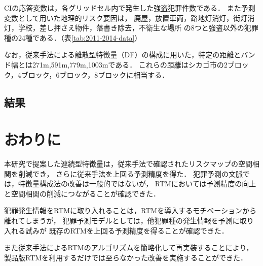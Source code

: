 CIの応答変数は，各グリッドセル内で発生した強盗犯罪件数である．
また予測変数として用いた地理的リスク要因は，
廃屋，放置車両，路地灯消灯，街灯消灯，学校，差し押さえ物件，落書き除去，不衛生な場所
の8つと強盗以外の犯罪種の24種である．（表\ref{tab:2011-2014-data}）

なお，従来手法による離散型特徴量（DF）の構成に用いた，特定の距離とバンド幅とは271m,591m,779m,1003mである．
これらの距離はシカゴ市の2ブロック，4ブロック，6ブロック，8ブロックに相当する．
\subsection{結果}


\section{おわりに}
本研究で提案した連続型特徴量は，従来手法で確認されたリスクマップの空間相関を削減でき，
さらに従来手法を上回る予測精度を得た．
犯罪予測の文脈では，特徴量構成法の改善は一般的ではないが，
RTMにおいては予測精度の向上と空間相関の削減につながることが確認できた．

犯罪発生情報をRTMに取り入れることは，RTMを導入するモチベーションから離れてしまうが，
犯罪予測モデルとしては，他犯罪種の発生情報を予測に取り入れる試みが
既存のRTMを上回る予測精度を得ることが確認できた．

また従来手法によるRTMのアルゴリズムを簡略化して再実装することにより，
製品版RTMを利用するだけでは至らなかった改善を実施することができた．


\begin{thebibliography}{99}



\end{thebibliography}


